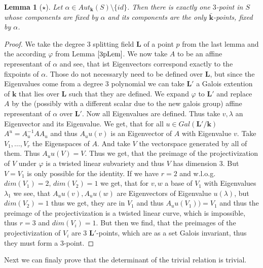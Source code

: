 \documentclass[12pt, oneside, reqno]{amsart}
\newtheorem{lemma}[theorem]{Lemma}
\begin{document}
\begin{lemma}[$\star$] \label{Fixpoints}
    Let $\alpha \in Aut_{\textbf{k}}(S) \setminus \{ id \}$. Then there is exactly one $3$-point in $S$ whose components are fixed by $\alpha$ and its components are the only $\bar{\textbf{k}}$-points, fixed by $\alpha$.
\end{lemma}
\begin{proof}
We take the degree $3$ splitting field $\textbf{L}$ of a point $p$ from the last lemma and the according $\varphi$ from Lemma $\ref{3pLem}$. We now take $A$ to be an affine representant of $\alpha$ and see, that ist Eigenvectors correspond exactly to the fixpoints of $\alpha$. Those do not necessaryly need to be defined over $\textbf{L}$, but since the Eigenvalues come from a degree $3$ polynomial we can take $\textbf{L}'$ a Galois extention of $\textbf{k}$ that lies over $\textbf{L}$ such that they are defined. We expand $\varphi$ to $\textbf{L}'$ and replace $A$ by the (possibly with a different scalar due to the new galois group) affine representant of $\alpha$ over $\textbf{L}'$. Now all Eigenvalues are defined. Thus take $v, \lambda$ an Eigenvector and its Eigenvalue. We get, that for all $u \in Gal(\textbf{L}'/ \textbf{k})$ $A^u = A_u^{-1} A A_u$ and thus $A_u u(v)$ is an Eigenvector of $A$ with Eigenvalue $v$. Take $V_1, \dots , V_r$ the Eigenspaces of $A$. And take $V$ the vectorspace generated by all of them. Thus $A_u u(V) = V$. Thus we get, that the preimage of the projectivization of $V$ under $\varphi$ is a twisted linear subvariety and thus $V$ has dimension $3$. But $V = V_1$ is only possible for the identity. If we have $r=2$ and w.l.o.g. $dim(V_1) = 2, \, dim(V_2) = 1$ we get, that for $v, w$ a base of $V_1$ with Eigenvalues $\lambda_1$ we see, that $A_u u(v), A_u u(w)$ are Eigenvectors of Eigenvalue $u(\lambda)$, but $dim(V_2) = 1$ thus we get, they are in $V_1$ and thus $A_uu(V_1)) = V_1$ and thus the preimage of the projectivization is a twisted linear curve, which is impossible, thus $r=3$ and $dim(V_i) = 1$. But then we find, that the preimages of the projectivization of $V_i$ are $3$ $\textbf{L}'$-points, which are as a set Galois invariant, thus they must form a $3$-point.
\end{proof}
\noindent
Next we can finaly prove that the determinant of the trivial relation is trivial.
\end{document}
